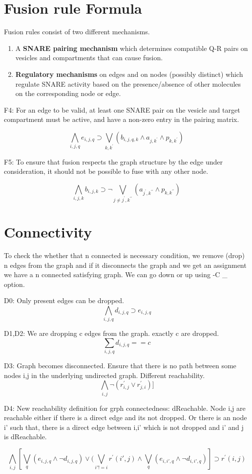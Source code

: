 \documentclass{llncs}
\begin{document}
\section{ Fusion rule Formula}

Fusion rules consist of two different mechanisms.

\begin{enumerate}
\item  A \textbf{SNARE pairing mechanism} which determines compatible Q-R pairs on vesicles and compartments that can cause fusion.
\item \textbf{Regulatory mechanisms} on edges and on nodes (possibly distinct) which regulate SNARE activity based on the presence/absence of other molecules on the corresponding node or edge.
\end{enumerate}

F4: For an edge to be valid, at least one SNARE pair on the vesicle and target compartment must be active, and have a non-zero entry in the pairing matrix.  

\[ \bigwedge\limits_{i,j,q} e_{i,j,q} \supset \bigvee_{k,k^{\prime}} (b_{i,j,q,k} \land a_{j,k^{\prime}} \land p_{k,k^{\prime}}) \, \]

F5: To ensure that fusion respects the graph structure by the edge under consideration, it should not be possible to fuse with any other node.

\[ \bigwedge\limits_{i,j,k} b_{i,j,k} \supset \neg \bigvee_{j \neq j^{\prime}, k^{\prime\prime}} ( a_{j^{\prime},k^{\prime\prime}} \land p_{k,k^{\prime\prime}}) \, \]


\section{Connectivity}
To check the whether that n connected is necessary condition, we remove (drop) n edges from the graph and if it disconnects the graph and we get an assignment we have a n connected satisfying graph. We can go down or up using -C \_ option.  \newline 

D0: Only present edges can be dropped.
\[ \bigwedge\limits_{i,j,q} d_{i,j,q} \supset e_{i,j,q}  \]

D1,D2: We are dropping c edges from the graph. exactly c are dropped.
\[ \sum_{i,j,q} d_{i,j,q} == c \]

D3:  Graph becomes disconnected. Ensure that there is no path between some nodes i,j in the underlying undirected graph. Different reachability.
\[ \bigwedge\limits_{i,j} \neg (r^{\prime}_{i,j} \lor r^{\prime}_{j,i})]  \]

D4: New reachability definition for grph connectedness: dReachable. Node i,j are reachable either if there is a direct edge and its not dropped. 
Or there is an node i' such that, there is a direct edge between i,i' which is not dropped and i' and j is dReachable.

\[ \bigwedge\limits_{i,j}  [\bigvee_{q} (e_{i,j,q} \land  \neg d_{i,j,q}) \lor  (\bigvee_{i' != i}  r^{\prime}(i',j) \land  \bigvee_{q} (e_{i,i',q} \land \neg d_{i,i',q}) ] \supset r^{\prime}(i,j)  \]
  
\end{document}
